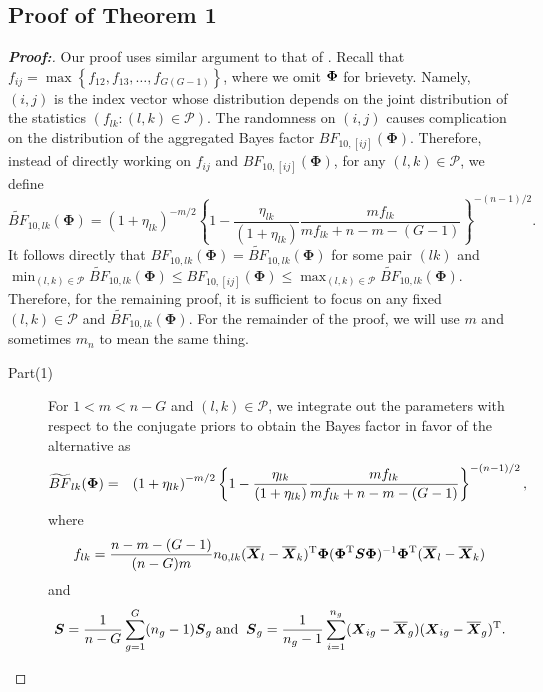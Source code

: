 \documentclass[alpha-refs]{wiley-article}
\theoremstyle{plain}%
\theoremstyle{definition}
\def\bse{\begin{eqnarray*}}
\def\ese{\end{eqnarray*}}
\def\be{\begin{eqnarray}}
\def\ee{\end{eqnarray}}
\def\trans{^{\rm T}}
\newcommand{\uS}       {\mbox{\boldmath$S$}}
\newcommand{\uX}       {\mbox{\boldmath$X$}}
\newcommand{\uPhi}              {\mbox{\boldmath$\Phi$}}
\begin{document}
\subsection*{Proof of Theorem 1}
\begin{proof}[\textbf{\upshape Proof:}]
Our proof uses similar argument to that of \cite{zoh2018powerful}. 
Recall that $f_{ij} = \max\left\{f_{12}, f_{13}, \ldots, f_{G(G-1)} \right\}$, where we omit $\uPhi$ for brievety. Namely, $(i, j)$ is the index vector whose distribution depends on the joint distribution of the statistics $(f_{lk}:(l, k)\in\mathcal{P})$. The randomness on $(i, j)$ causes complication on the distribution of the aggregated Bayes factor $BF_{10,[ij]}(\mathbf{\Phi})$. 
Therefore, instead of directly working on $f_{ij}$ and $BF_{10, [ij]}(\mathbf{\Phi})$, for any $(l, k)\in\mathcal{P}$, we define 
\[
\widetilde{BF}_{10,lk}(\mathbf{\Phi}) = \left(1 + \eta_{lk} \right)^{-m/2} \left\{ 1 - \frac{\eta_{lk}}{(1 + \eta_{lk})}\frac{ m f_{lk}}{ m f_{lk}  + n - m - (G-1)} \right\}^{-(n-1)/2}.
\]
It follows directly that $BF_{10,lk}(\mathbf{\Phi}) = \widetilde{BF}_{10,lk}(\mathbf{\Phi})$ for some pair $(lk)$ and $\min_{(l,k)\in\mathcal{P}}\widetilde{BF}_{10,lk}(\mathbf{\Phi})\leq BF_{10, [ij]}(\mathbf{\Phi})\leq \max_{(l,k)\in\mathcal{P}}\widetilde{BF}_{10,lk}(\mathbf{\Phi})$. Therefore, for the remaining proof, it is sufficient to focus on any fixed $(l, k)\in\mathcal{P}$ and $\widetilde{BF}_{10, lk}(\mathbf{\Phi})$. For the remainder of the proof, we will use $m$ and sometimes $m_n$ to mean the same thing. 
\begin{description}
\item[Part(1)]
For $1 < m < n - G$ and 
$(l, k)\in\mathcal{P}$,
we integrate out the parameters with respect to the conjugate priors to obtain the Bayes factor in favor of the alternative as
\be
\widetilde{BF}_{lk}(\uPhi) &=&
\left(1 + \eta_{lk} \right)^{-m/2} \left\{ 1 - \frac{\eta_{lk}}{(1 + \eta_{lk})}\frac{ m f_{lk}}{ m f_{lk}  + n - m - (G-1)} \right\}^{-(n-1)/2} 
\nonumber,
\ee
where
\bse
f_{lk}  = \frac{n - m - (G-1)}{(n-G)m} n_{0,lk}(\overline{\uX}_l - \overline{\uX}_k)\trans \uPhi(\uPhi\trans \uS\uPhi )^{-1}\uPhi\trans (\overline{\uX}_l - \overline{\uX}_k)
\ese
and $$ \uS = \frac{1}{n - G} \sum^{G}_{g=1}(n_g -1)\uS_{g}\; \text{and} \;\; \uS_g = \frac{1}{n_g - 1}\sum^{n_g}_{i=1}(\uX_{ig} - \overline{\uX}_{g})(\uX_{ig} - \overline{\uX}_{g})\trans.$$

\end{description}
\end{proof}
\end{document}
